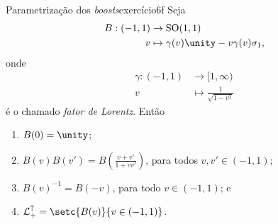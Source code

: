 \begin{proposition}{Parametrização dos \emph{boosts}}{exercício6f}
    Seja
    \begin{align*}
        B : (-1,1) &\to \mathrm{SO}(1,1)\\
                 v &\mapsto \gamma(v) \unity - v \gamma(v) \sigma_1,
    \end{align*}
    onde
    \begin{align*}
        \gamma : (-1,1) &\to [1, \infty)\\
                      v &\mapsto \frac{1}{\sqrt{1 - v^2}}
    \end{align*}
    é o chamado \emph{fator de Lorentz}. Então
    \begin{enumerate}[label=(\alph*)]
        \item \(B(0) = \unity\);
        \item \(B(v)B(v') = B\left(\frac{v + v'}{1 + vv'}\right)\), para todos \(v,v' \in (-1,1)\);
        \item \(B(v)^{-1} = B(-v)\), para todo \(v \in (-1,1)\); e
        \item \(\mathcal{L}_+^\uparrow = \setc{B(v)}{v \in (-1,1)}\).
    \end{enumerate}
\end{proposition}
